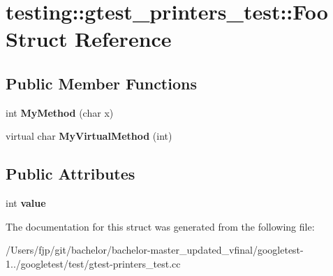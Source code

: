 \hypertarget{structtesting_1_1gtest__printers__test_1_1_foo}{}\section{testing\+:\+:gtest\+\_\+printers\+\_\+test\+:\+:Foo Struct Reference}
\label{structtesting_1_1gtest__printers__test_1_1_foo}
\subsection*{Public Member Functions}
\begin{DoxyCompactItemize}
\item 
\mbox{\label{structtesting_1_1gtest__printers__test_1_1_foo_a703c1159114f3a640b16d470a9613672}} 
int {\bfseries My\+Method} (char x)
\item 
\mbox{\label{structtesting_1_1gtest__printers__test_1_1_foo_a368dc5150b27c2aaca6034830334e1cd}} 
virtual char {\bfseries My\+Virtual\+Method} (int)
\end{DoxyCompactItemize}
\subsection*{Public Attributes}
\begin{DoxyCompactItemize}
\item 
\mbox{\label{structtesting_1_1gtest__printers__test_1_1_foo_a8171a69191d34071ea4448d2dda501ec}} 
int {\bfseries value}
\end{DoxyCompactItemize}


The documentation for this struct was generated from the following file\+:\begin{DoxyCompactItemize}
\item 
/\+Users/fjp/git/bachelor/bachelor-\/master\+\_\+updated\+\_\+vfinal/googletest-\/1../googletest/test/gtest-\/printers\+\_\+test.\+cc\end{DoxyCompactItemize}
